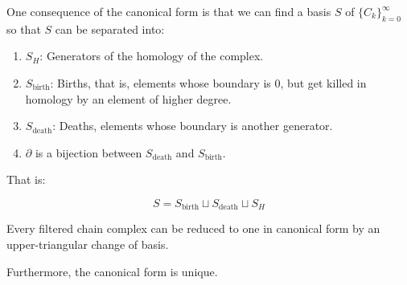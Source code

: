 \begin{remark}
\label{canonicalformsplit}
One consequence of the canonical form is that we can find a basis $S$ 
of $\{C_k\}_{k=0}^{\infty}$ so that $S$
can be separated into: 
\begin{enumerate}
\item $S_H$: Generators of the homology of the complex.

\item $S_{\text{birth}}$: Births, that is, elements whose boundary is $0$, but get killed in homology by an element of higher degree.

\item $S_{\text{death}}$: Deaths, elements whose boundary is another generator. 

\item $\partial$ is a bijection between $S_{\text{death}}$ 
and $S_{\text{birth}}$.
\end{enumerate}

That is:

$$
S=S_{\text{birth}}\sqcup
S_{\text{death}}\sqcup
 S_H
$$ 
\end{remark}

\begin{theorem}
\cite{bar1994}
Every filtered chain complex can be reduced to 
one in canonical form by an upper-triangular change of basis.

Furthermore, the canonical form is unique.
\end{theorem}


